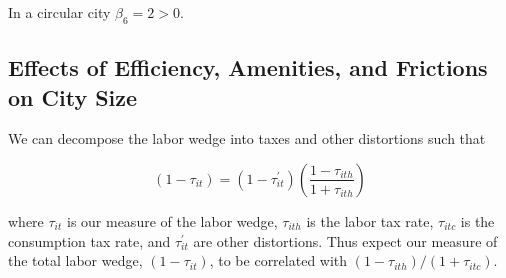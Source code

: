 In a circular city $\beta_6 = 2 > 0$.

\subsection{Effects of Efficiency, Amenities, and Frictions on City Size}

We can decompose the labor wedge into taxes and other distortions such that

\begin{equation}
    (1 - \tau_{it}) = (1 - \tau_{it}^\prime) (\frac{1 - \tau_{ith}}{1 + \tau_{ith}})
\end{equation}

where $\tau_{it}$ is our measure of the labor wedge, $\tau_{ith}$ is the labor tax rate, $\tau_{itc}$ is the consumption tax rate, and $\tau_{it}^\prime$ are other distortions. Thus expect our measure of the total labor wedge, $(1 - \tau_{it})$, to be correlated with $(1 - \tau_{ith}) / (1 + \tau_{itc})$.